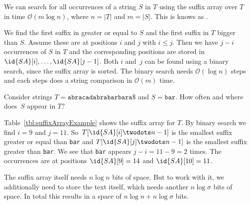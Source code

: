 \begin{Theorem}
  We can search for all occurrences of a string $S$ in $T$ using the suffix array  over $T$ in time $\mathcal{O}(m\log n)$, where $n = \vert T \vert$ and $m = \vert S \vert$. This is knows as .
\end{Theorem}

\begin{Proof}
  We find the first suffix in  greater or equal to $S$ and the first suffix in $T$ bigger than $S$. Assume these are at positions $i$ and $j$ with $i \leq j$. Then we have $j - i$ occurrences of $S$ in $T$ and the corresponding positions are stored in $\id{SA}[i], \ldots, \id{SA}[j-1]$. Both $i$ and~$j$ can be found using a binary search, since the suffix array is sorted. The binary search needs $\mathcal{O}(\log n)$ steps and each steps does a string comparison in $\mathcal{O}(m)$ time.
\end{Proof}

\begin{Example}
  Consider strings $T=\texttt{abracadabrabarbara\$}$ and $S=\texttt{bar}$. How often and where does~$S$ appear in $T$?

  Table~\ref{tbl:suffixArrayExample} shows the suffix array for $T$. By binary search we find $i = 9$ and $j = 11$. So~$T[\id{SA}[i] \twodots n-1]$ is the smallest suffix greater or equal than \texttt{bar} and $T[\id{SA}[j] \twodots n-1]$ is the smallest suffix greater than \texttt{bar}. We see that \texttt{bar} appears $j-i=11-9=2$ times. The occurrences are at positions $\id{SA}[9]=14$ and $\id{SA}[10]=11$.
\end{Example}

The suffix array itself needs $n\log n$ bits of space. But to work with it, we additionally need to store the text itself, which needs another $n\log\sigma$ bits of space. In total this results in a space of $n\log n + n\log\sigma$ bits.
